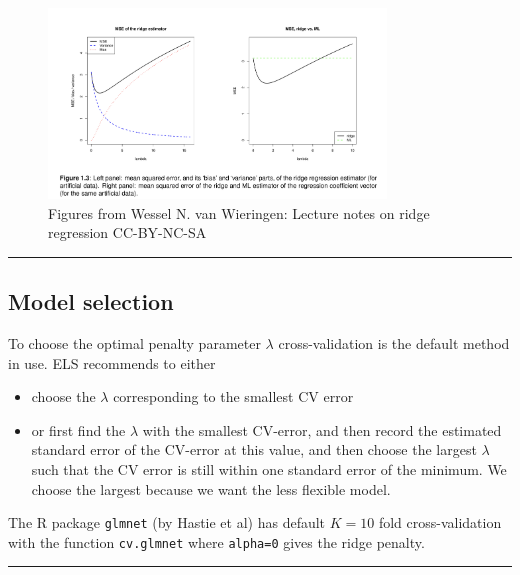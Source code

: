 \documentclass[
  letterpaper,
  DIV=11,
  numbers=noendperiod]{scrartcl}
\providecommand{\tightlist}{%
  \setlength{\itemsep}{0pt}\setlength{\parskip}{0pt}}\usepackage{longtable,booktabs,array}
\begin{document}
\begin{figure}

{\centering \includegraphics[width=0.8\textwidth,height=\textheight]{./WNvWFig13.jpg}

}

\caption{Figures from Wessel N. van Wieringen: Lecture notes on ridge
regression CC-BY-NC-SA}

\end{figure}

\begin{center}\rule{0.5\linewidth}{0.5pt}\end{center}

\hypertarget{model-selection}{%
\subsection{Model selection}\label{model-selection}}

To choose the optimal penalty parameter \(\lambda\) cross-validation is
the default method in use. ELS recommends to either

\begin{itemize}
\tightlist
\item
  choose the \(\lambda\) corresponding to the smallest CV error
\item
  or first find the \(\lambda\) with the smallest CV-error, and then
  record the estimated standard error of the CV-error at this value, and
  then choose the largest \(\lambda\) such that the CV error is still
  within one standard error of the minimum. We choose the largest
  because we want the less flexible model.
\end{itemize}

The R package \texttt{glmnet} (by Hastie et al) has default \(K=10\)
fold cross-validation with the function \texttt{cv.glmnet} where
\texttt{alpha=0} gives the ridge penalty.

\begin{center}\rule{0.5\linewidth}{0.5pt}\end{center}
\end{document}
